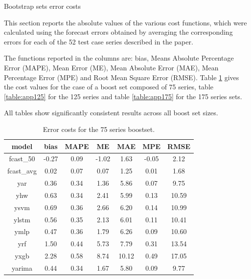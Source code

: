 \documentclass[ijoc,sglanonrev]{informs4}
\begin{document}
%
\clearpage %
\begin{APPENDIX}{Bootstrap sets error costs} \label{app:errcost}

This section reports the absolute values of the various cost functions, which were calculated using the forecast errors obtained by averaging the corresponding errors for each of the 52 test case series described in the paper.

The functions reported in the columns are: bias, Means Absolute Percentage Error (MAPE), Mean Error (ME), Mean Absolute Error (MAE), Mean Percentage Error (MPE) and Root Mean Square Error (RMSE). Table \ref{table:app75} gives the cost values for the case of a boost set composed of 75 series, table \ref{table:app125} for the 125 series and table \ref{table:app175} for the 175 series sets.

All tables show significantly consistent results across all boost set sizes.

\begin{table}[h]
\centering
\renewcommand{\arraystretch}{0.75}
\begin{tabular}{ccccccc}
model & bias & MAPE & ME & MAE & MPE & RMSE \\
\hline
fcast\_50   &-0.27 & 0.09 &-1.02 & 1.63 &-0.05 &  2.12 \\
fcast\_avg  & 0.02 & 0.07 & 0.07 & 1.25 & 0.01 &  1.68 \\
yar         & 0.36 & 0.34 & 1.36 & 5.86 & 0.07 &  9.75 \\
yhw         & 0.63 & 0.34 & 2.41 & 5.99 & 0.13 & 10.59 \\
ysvm        & 0.69 & 0.36 & 2.66 & 6.20 & 0.14 & 10.99 \\
ylstm       & 0.56 & 0.35 & 2.13 & 6.01 & 0.11 & 10.41 \\
ymlp        & 0.47 & 0.36 & 1.79 & 6.26 & 0.09 & 10.60 \\
yrf         & 1.50 & 0.44 & 5.73 & 7.79 & 0.31 & 13.54 \\
yxgb        & 2.28 & 0.58 & 8.74 &10.12 & 0.49 & 17.05 \\
yarima      & 0.44 & 0.34 & 1.67 & 5.80 & 0.09 &  9.77 \\
\hline
\end{tabular}
\caption{Error costs for the 75 series boostset.}
\label{table:app75}
\end{table}


\end{APPENDIX}
\end{document}
